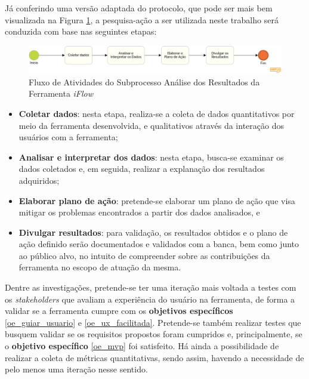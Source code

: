 Já conferindo uma versão adaptada do protocolo, que pode ser mais bem visualizada na Figura \ref{fig:bpmn_analise}, a pesquisa-ação a ser utilizada neste trabalho será conduzida com base nas seguintes etapas:

\begin{figure}[H]
    \begin{center}
        \caption{Fluxo de Atividades do Subprocesso Análise dos Resultados da Ferramenta \textit{iFlow}}
        \label{fig:bpmn_analise}
        \includegraphics[scale=0.28]{figuras/Metodologia/bpmn_analise.png}
    \end{center}
\end{figure}

\begin{itemize}
    \item \textbf{Coletar dados}: nesta etapa, realiza-se a coleta de dados quantitativos por meio da ferramenta desenvolvida, e qualitativos através da interação dos usuários com a ferramenta;
    \item \textbf{Analisar e interpretar dos dados}: nesta etapa, busca-se examinar os dados coletados e, em seguida, realizar a explanação dos resultados adquiridos;
    \item \textbf{Elaborar plano de ação}: pretende-se elaborar um plano de ação que visa mitigar os problemas encontrados a partir dos dados analisados, e 
    \item \textbf{Divulgar resultados}: para validação, os resultados obtidos e o plano de ação definido serão documentados e validados com a banca, bem como junto ao público alvo, no intuito de compreender sobre as contribuições da ferramenta no escopo de atuação da mesma.
\end{itemize}

Dentre as investigações, pretende-se ter uma iteração mais voltada a testes com os \textit{stakeholders} que avaliam a experiência do usuário na ferramenta, de forma a validar se a ferramenta cumpre com os \textbf{objetivos específicos} \ref{oe_guiar_usuario} e \ref{oe_ux_facilitada}. Pretende-se também realizar testes que busquem validar se os requisitos propostos foram cumpridos e, principalmente, se o \textbf{objetivo específico} \ref{oe_mvp} foi satisfeito. Há ainda a possibilidade de realizar a coleta de métricas quantitativas, sendo assim, havendo a necessidade de pelo menos uma iteração nesse sentido.

